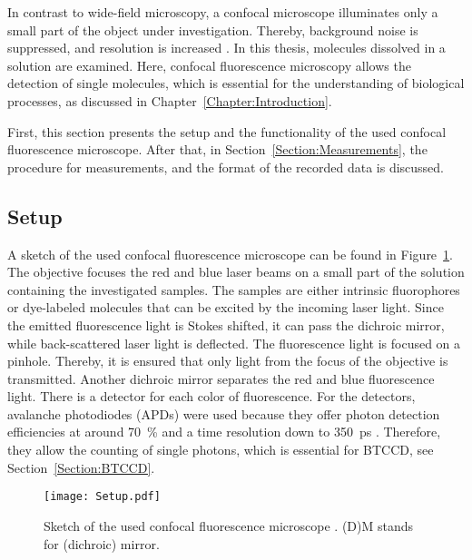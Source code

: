 In contrast to wide-field microscopy, a confocal microscope illuminates only a small part of the object under investigation. Thereby, background noise is suppressed, and resolution is increased \cite{Lakowicz2006}. In this thesis, molecules dissolved in a solution are examined. Here, confocal fluorescence microscopy allows the detection of single molecules, which is essential for the understanding of biological processes, as discussed in Chapter~\ref{Chapter:Introduction}. 

First, this section presents the setup and the functionality of the used confocal fluorescence microscope. After that, in Section~\ref{Section:Measurements}, the procedure for measurements, and the format of the recorded data is discussed. 

\subsection{Setup}

A sketch of the used confocal fluorescence microscope can be found in Figure~\ref{fig:Setup}. The objective focuses the red and blue laser beams on a small part of the solution containing the investigated samples. The samples are either intrinsic fluorophores or dye-labeled molecules that can be excited by the incoming laser light. Since the emitted fluorescence light is Stokes shifted, it can pass the dichroic mirror, while back-scattered laser light is deflected. The fluorescence light is focused on a pinhole. Thereby, it is ensured that only light from the focus of the objective is transmitted. Another dichroic mirror separates the red and blue fluorescence light.  There is a detector for each color of fluorescence. For the detectors, avalanche photodiodes (APDs) were used because they offer photon detection efficiencies at around \SI{70}{\percent} and a time resolution down to \SI{350}{\pico\second} \cite{CountT,tauSPAD}. Therefore, they allow the counting of single photons, which is essential for \gls{BTCCD}, see Section~\ref{Section:BTCCD}.

\begin{figure}[h!]
	\centering
	\texttt{[image: Setup.pdf]}
	\caption[Sketch of used confocal fluorescence microscope]{Sketch of the used confocal fluorescence microscope \cite{MicroTime200,Schwille2001}. (D)M stands for (dichroic) mirror.}
	\label{fig:Setup}
\end{figure}

